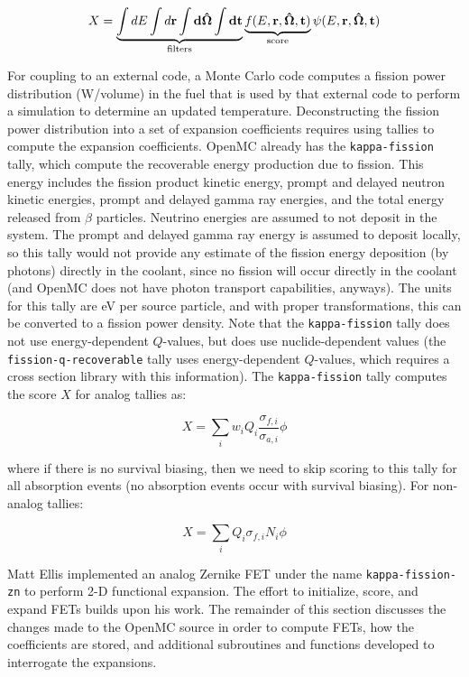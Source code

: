 \documentclass[10pt]{article}
\newcommand{\beq}{\begin{equation}}
\newcommand{\eeq}{\end{equation}}
\numberwithin{equation}{section} %
\begin{document}
\beq
X=\underbrace{\int dE\int d\bf{r}\int d\hat{\Omega}\int dt}_{\textrm{filters}} \underbrace{f(E,\bf{r},\hat{\Omega},t)}_{\textrm{score}}\psi(E,\bf{r},\hat{\Omega},t)
\eeq

For coupling to an external code, a Monte Carlo code computes a fission power distribution (W/volume) in the fuel that is used by that external code to perform a simulation to determine an updated temperature. Deconstructing the fission power distribution into a set of expansion coefficients requires using tallies to compute the expansion coefficients. OpenMC already has the {\tt kappa-fission} tally, which compute the recoverable energy production due to fission. This energy includes the fission product kinetic energy, prompt and delayed neutron kinetic energies, prompt and delayed gamma ray energies, and the total energy released from \(\beta\) particles. Neutrino energies are assumed to not deposit in the system. The prompt and delayed gamma ray energy is assumed to deposit locally, so this tally would not provide any estimate of the fission energy deposition (by photons) directly in the coolant, since no fission will occur directly in the coolant (and OpenMC does not have photon transport capabilities, anyways). The units for this tally are eV per source particle, and with proper transformations, this can be converted to a fission power density. Note that the {\tt kappa-fission} tally does not use energy-dependent \(Q\)-values, but does use nuclide-dependent values (the {\tt fission-q-recoverable} tally uses energy-dependent \(Q\)-values, which requires a cross section library with this information). The {\tt kappa-fission} tally computes the score \(X\) for analog tallies as:

\beq
X=\sum_{i}w_iQ_i\frac{\sigma_{f,i}}{\sigma_{a,i}}\phi
\eeq

where if there is no survival biasing, then we need to skip scoring to this tally for all absorption events (no absorption events occur with survival biasing). For non-analog tallies:

\beq
X=\sum_{i}Q_i\sigma_{f,i}N_i\phi
\eeq

Matt Ellis implemented an analog Zernike FET under the name {\tt kappa-fission-zn} to perform 2-D functional expansion. The effort to initialize, score, and expand FETs builds upon his work. The remainder of this section discusses the changes made to the OpenMC source in order to compute FETs, how the coefficients are stored, and additional subroutines and functions developed to interrogate the expansions.
\end{document}

